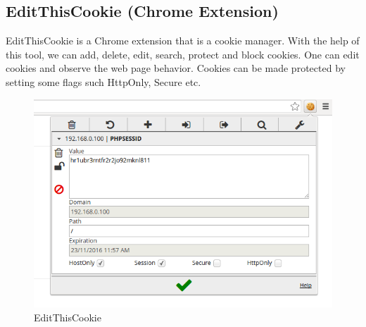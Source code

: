 \subsection{EditThisCookie (Chrome Extension)}
EditThisCookie is a Chrome extension that is a cookie manager. With the help of this tool, we can add, delete, edit, search, protect and block cookies.
One can edit cookies and observe the web page behavior. Cookies can be made protected by setting some flags such HttpOnly, Secure etc. \\
\begin{figure}[ht]
	\centering
	\includegraphics[width=.8\linewidth]{figures/tool_edit_this_cookie.png}
	\caption{EditThisCookie}
	\label{fig:tool_edit_this_cookie}
\end{figure}